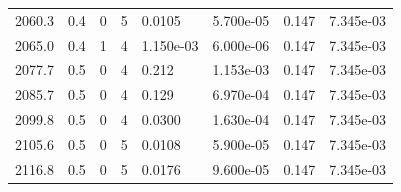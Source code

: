 \documentclass[preview]{standalone}
\begin{document}
{{{{{{\begin{tabular}{L{1.2cm}C{1.2cm} C{0.3cm}C{0.5cm} C{1.4cm}C{1.4cm} C{1.4cm}C{1.4cm}}
  2060.3  &   0.4  & 0     &  5 &  0.0105  & 5.700e-05  & 0.147 &  7.345e-03   \\ 
  2065.0  &   0.4  & 1     &  4 &  1.150e-03  & 6.000e-06  & 0.147 &  7.345e-03   \\ 
  2077.7  &   0.5  & 0     &  4 &  0.212  & 1.153e-03  & 0.147 &  7.345e-03   \\ 
  2085.7  &   0.5  & 0     &  4 &  0.129  & 6.970e-04  & 0.147 &  7.345e-03   \\ 
  2099.8  &   0.5  & 0     &  4 &  0.0300  & 1.630e-04  & 0.147 &  7.345e-03   \\ 
  2105.6  &   0.5  & 0     &  5 &  0.0108  & 5.900e-05  & 0.147 &  7.345e-03   \\ 
  2116.8  &   0.5  & 0     &  5 &  0.0176  & 9.600e-05  & 0.147 &  7.345e-03   \\ 
\hline 
\end{tabular} 

}}}}}}
\end{document}

